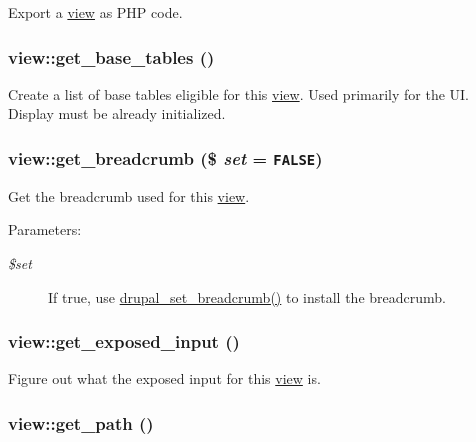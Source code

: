 Export a \hyperlink{classview}{view} as PHP code. \hypertarget{classview_e938f5f192743bc0a231e21f60b37383}{
\subsubsection[{get\_\-base\_\-tables}]{\setlength{\rightskip}{0pt plus 5cm}view::get\_\-base\_\-tables ()}}
\label{classview_e938f5f192743bc0a231e21f60b37383}


Create a list of base tables eligible for this \hyperlink{classview}{view}. Used primarily for the UI. Display must be already initialized. \hypertarget{classview_c8087bdc827dcf6f79630158f9941260}{
\subsubsection[{get\_\-breadcrumb}]{\setlength{\rightskip}{0pt plus 5cm}view::get\_\-breadcrumb (\$ {\em set} = {\tt FALSE})}}
\label{classview_c8087bdc827dcf6f79630158f9941260}


Get the breadcrumb used for this \hyperlink{classview}{view}.

\begin{Desc}
\item[Parameters:]
\begin{description}
\item[{\em \$set}]If true, use \hyperlink{common_8inc_666113d06fa6ea461aff580e5c511eb0}{drupal\_\-set\_\-breadcrumb()} to install the breadcrumb. \end{description}
\end{Desc}
\hypertarget{classview_c89e7aa08b258bc09d8e6209c6ebcfc2}{
\subsubsection[{get\_\-exposed\_\-input}]{\setlength{\rightskip}{0pt plus 5cm}view::get\_\-exposed\_\-input ()}}
\label{classview_c89e7aa08b258bc09d8e6209c6ebcfc2}


Figure out what the exposed input for this \hyperlink{classview}{view} is. \hypertarget{classview_2a43eaa103f3bb4c6677afbf8a94a549}{
\subsubsection[{get\_\-path}]{\setlength{\rightskip}{0pt plus 5cm}view::get\_\-path ()}}
\label{classview_2a43eaa103f3bb4c6677afbf8a94a549}


